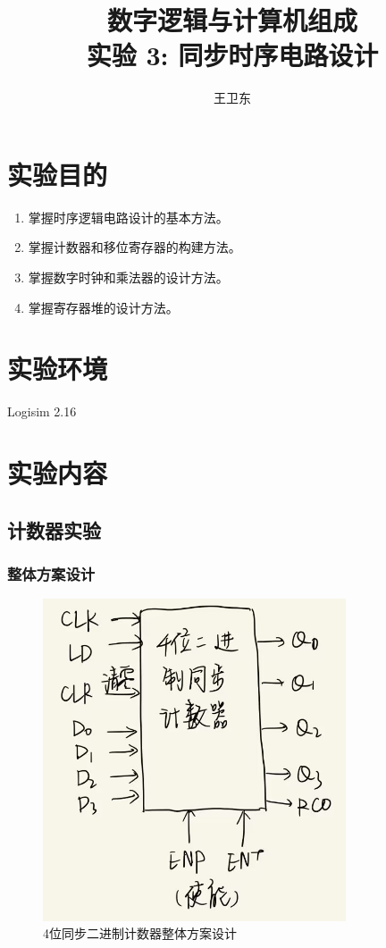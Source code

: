 \documentclass{article}
\title{数字逻辑与计算机组成\\ {\small 实验 3: 同步时序电路设计}}
\author{王卫东\quad 221900332}
\date{\zhtoday}
\begin{document}
    \maketitle

    \section{实验目的}

    \begin{enumerate}
        \item 掌握时序逻辑电路设计的基本方法。
        \item 掌握计数器和移位寄存器的构建方法。
        \item 掌握数字时钟和乘法器的设计方法。
        \item 掌握寄存器堆的设计方法。
    \end{enumerate}

    \section{实验环境}

    Logisim 2.16

    \section{实验内容}
    
    \subsection{计数器实验}

    \subsubsection{整体方案设计}
    \begin{figure}[H]
    \centering
    \includegraphics[width=0.8\textwidth]{1.1.png}
    \caption{4位同步二进制计数器整体方案设计}
    \end{figure}
\end{document}
